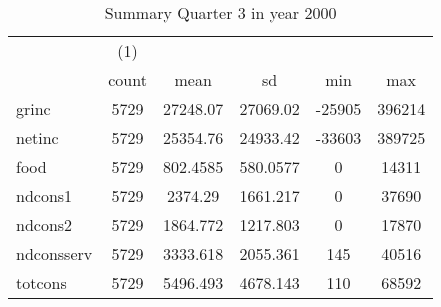 \begin{table}[htbp]\centering
\def\sym#1{\ifmmode^{#1}\else\(^{#1}\)\fi}
\caption{Summary Quarter 3 in year 2000 \label{sum\_Q3\_y2000}}
\begin{tabular}{l*{1}{ccccc}}
\hline\hline
            &\multicolumn{1}{c}{(1)}&            &            &            &            \\
            &       count&        mean&          sd&         min&         max\\
\hline
grinc       &        5729&    27248.07&    27069.02&      -25905&      396214\\
netinc      &        5729&    25354.76&    24933.42&      -33603&      389725\\
food        &        5729&    802.4585&    580.0577&           0&       14311\\
ndcons1     &        5729&     2374.29&    1661.217&           0&       37690\\
ndcons2     &        5729&    1864.772&    1217.803&           0&       17870\\
ndconsserv  &        5729&    3333.618&    2055.361&         145&       40516\\
totcons     &        5729&    5496.493&    4678.143&         110&       68592\\
\hline\hline
\end{tabular}
\end{table}
